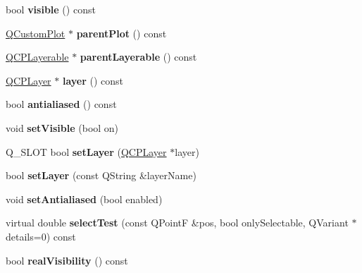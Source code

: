 \begin{DoxyCompactItemize}
\item 
bool {\bfseries visible} () const \hypertarget{class_q_c_p_layerable_a10a3cc92e0fa63e4a929e61d34e275a7}{}\label{class_q_c_p_layerable_a10a3cc92e0fa63e4a929e61d34e275a7}

\item 
\hyperlink{class_q_custom_plot}{Q\+Custom\+Plot} $\ast$ {\bfseries parent\+Plot} () const \hypertarget{class_q_c_p_layerable_ab7e0e94461566093d36ffc0f5312b109}{}\label{class_q_c_p_layerable_ab7e0e94461566093d36ffc0f5312b109}

\item 
\hyperlink{class_q_c_p_layerable}{Q\+C\+P\+Layerable} $\ast$ {\bfseries parent\+Layerable} () const \hypertarget{class_q_c_p_layerable_aecaafc76ad8146d2a4d54837c5eada46}{}\label{class_q_c_p_layerable_aecaafc76ad8146d2a4d54837c5eada46}

\item 
\hyperlink{class_q_c_p_layer}{Q\+C\+P\+Layer} $\ast$ {\bfseries layer} () const \hypertarget{class_q_c_p_layerable_aea67e8c19145e70d68c286a36f6b8300}{}\label{class_q_c_p_layerable_aea67e8c19145e70d68c286a36f6b8300}

\item 
bool {\bfseries antialiased} () const \hypertarget{class_q_c_p_layerable_aef5cb4aa899ed9dc9384fd614560291e}{}\label{class_q_c_p_layerable_aef5cb4aa899ed9dc9384fd614560291e}

\item 
void {\bfseries set\+Visible} (bool on)\hypertarget{class_q_c_p_layerable_a3bed99ddc396b48ce3ebfdc0418744f8}{}\label{class_q_c_p_layerable_a3bed99ddc396b48ce3ebfdc0418744f8}

\item 
Q\+\_\+\+S\+L\+OT bool {\bfseries set\+Layer} (\hyperlink{class_q_c_p_layer}{Q\+C\+P\+Layer} $\ast$layer)\hypertarget{class_q_c_p_layerable_aea8c061ee8a1aa7ea88ee9ca9cbaa773}{}\label{class_q_c_p_layerable_aea8c061ee8a1aa7ea88ee9ca9cbaa773}

\item 
bool {\bfseries set\+Layer} (const Q\+String \&layer\+Name)\hypertarget{class_q_c_p_layerable_ab25a0e7b897993b44447caee0f142083}{}\label{class_q_c_p_layerable_ab25a0e7b897993b44447caee0f142083}

\item 
void {\bfseries set\+Antialiased} (bool enabled)\hypertarget{class_q_c_p_layerable_a4fd43e89be4a553ead41652565ff0581}{}\label{class_q_c_p_layerable_a4fd43e89be4a553ead41652565ff0581}

\item 
virtual double {\bfseries select\+Test} (const Q\+PointF \&pos, bool only\+Selectable, Q\+Variant $\ast$details=0) const \hypertarget{class_q_c_p_layerable_a99b721af31986cf960264f0cf7203967}{}\label{class_q_c_p_layerable_a99b721af31986cf960264f0cf7203967}

\item 
bool {\bfseries real\+Visibility} () const \hypertarget{class_q_c_p_layerable_a30809f7455e9794bca7b6c737622fa63}{}\label{class_q_c_p_layerable_a30809f7455e9794bca7b6c737622fa63}

\end{DoxyCompactItemize}
